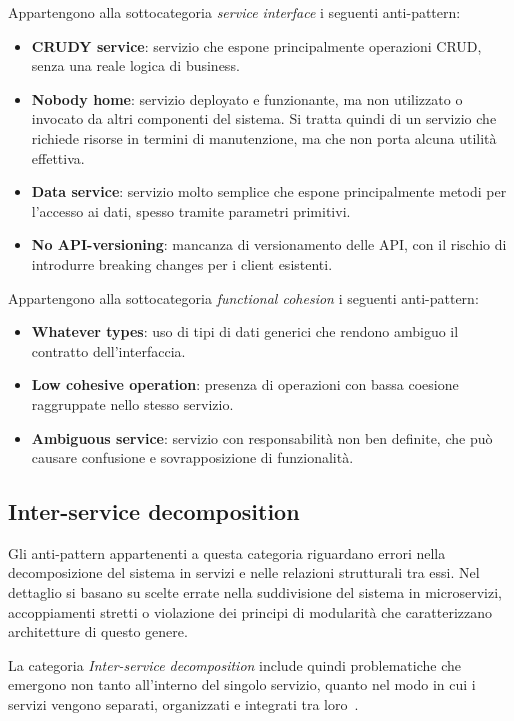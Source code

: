 Appartengono alla sottocategoria \textit{service interface} i seguenti anti-pattern:
\begin{itemize}
    \item \textbf{CRUDY service}: servizio che espone principalmente operazioni CRUD, senza una reale logica di business.
    \item \textbf{Nobody home}: servizio deployato e funzionante, ma non utilizzato o invocato da altri componenti del sistema. Si tratta quindi di un servizio che richiede risorse in termini di manutenzione, ma che non porta alcuna utilità effettiva.
    \item \textbf{Data service}: servizio molto semplice che espone principalmente metodi per l’accesso ai dati, spesso tramite parametri primitivi.
    \item \textbf{No API-versioning}: mancanza di versionamento delle API, con il rischio di introdurre breaking changes per i client esistenti.
\end{itemize}

Appartengono alla sottocategoria \textit{functional cohesion} i seguenti anti-pattern:
\begin{itemize}
    \item \textbf{Whatever types}: uso di tipi di dati generici che rendono ambiguo il contratto dell’interfaccia.
    \item \textbf{Low cohesive operation}: presenza di operazioni con bassa coesione raggruppate nello stesso servizio.
    \item \textbf{Ambiguous service}: servizio con responsabilità non ben definite, che può causare confusione e sovrapposizione di funzionalità.
\end{itemize}

\subsection{Inter-service decomposition}

Gli anti-pattern appartenenti a questa categoria riguardano errori nella decomposizione del sistema in servizi e nelle relazioni strutturali tra essi. Nel dettaglio si basano su scelte errate nella suddivisione del sistema in microservizi, accoppiamenti stretti o violazione dei principi di modularità che caratterizzano architetture di questo genere.

La categoria \textit{Inter-service decomposition} include quindi problematiche che emergono non tanto all’interno del singolo servizio, quanto nel modo in cui i servizi vengono separati, organizzati e integrati tra loro~\cite{CernyCatalogo}.

